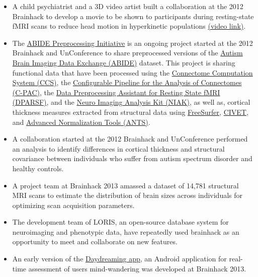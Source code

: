 \documentclass[11pt]{bmc_article_s50}
\begin{document}
\begin{itemize}
\item 
  A child psychiatrist and a 3D video artist built a collaboration at the 2012 Brainhack to develop a movie to be shown to participants during resting-state fMRI scans to reduce head motion in hyperkinetic populations \href{http://vimeo.com/67962604}{(video link)}\cite{vanderwal2015}.
\item 
  The \href{http://preprocessed-connectomes-project.github.io/abide}{ABIDE Preprocessing Initiative} is an ongoing project started at the 2012 Brainhack and UnConference to share preprocessed versions of the \href{http://fcon_1000.projects.nitrc.org/indi/abide}{Autism Brain Imaging Data Exchange (ABIDE)} dataset. This project is sharing functional data that have been processed using the \href{http://lfcd.psych.ac.cn/ccs.html}{Connectome Computation System (CCS)}, the \href{http://fcp-indi.github.io}{Configurable Pipeline for the Analysis of Connectomes (C-PAC)}, the \href{http://rfmri.org/DPARSF}{Data Preprocessing Assistant for Resting State fMRI (DPARSF)}, and the \href{https://www.nitrc.org/projects/niak/}{Neuro Imaging Analysis Kit (NIAK)}, as well as, cortical thickness measures extracted from structural data using \href{http://freesurfer.net/}{FreeSurfer}, \href{http://www.bic.mni.mcgill.ca/ServicesSoftware/CIVET}{CIVET}, and \href{http://picsl.upenn.edu/software/ants/}{Advanced Normalization Tools (ANTS)}.
\item
  A collaboration started at the 2012 Brainhack and UnConference performed an analysis to identify differences in cortical thickness and structural covariance between individuals who suffer from autism spectrum disorder and healthy controls\cite{Valk2015}.
\item 
  A project team at Brainhack 2013 amassed a dataset of 14,781 structural MRI scans to estimate the distribution of brain sizes across individuals for optimizing scan acquisition parameters\cite{Mennes2014}.
\item 
  The development team of LORIS, an open-source database system for neuroimaging and phenotypic data, have repeatedly used brainhack as an opportunity to meet and collaborate on new features\cite{Das2012}.
\item
  An early version of the \href{http://daydreaming-the-app.net}{Daydreaming app}, an Android application for real-time assessment of users mind-wandering was developed at Brainhack 2013.
\end{itemize}
\end{document}
